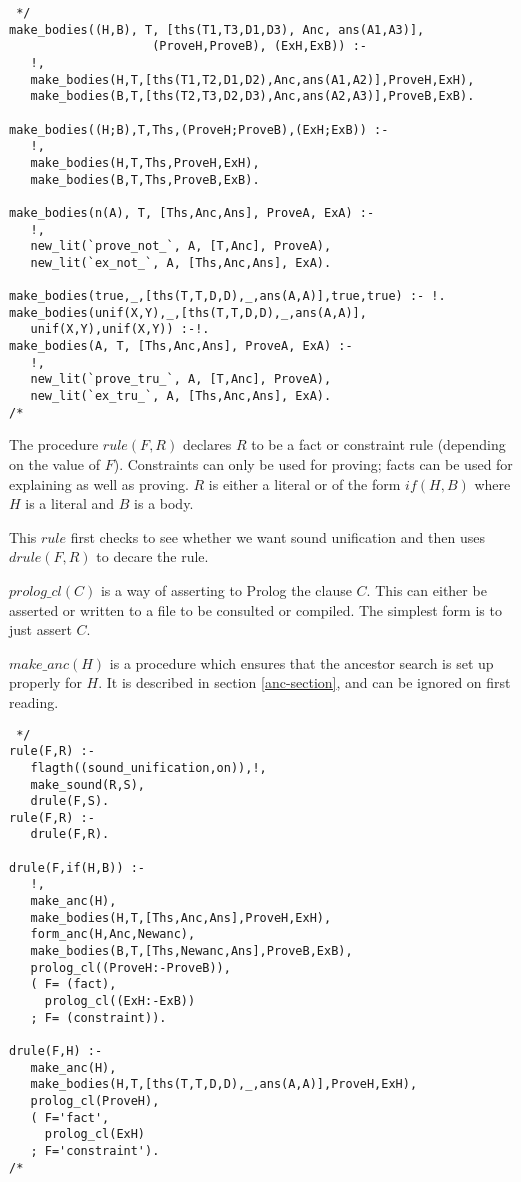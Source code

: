 \begin{verbatim} */
make_bodies((H,B), T, [ths(T1,T3,D1,D3), Anc, ans(A1,A3)],
                    (ProveH,ProveB), (ExH,ExB)) :-
   !,
   make_bodies(H,T,[ths(T1,T2,D1,D2),Anc,ans(A1,A2)],ProveH,ExH),
   make_bodies(B,T,[ths(T2,T3,D2,D3),Anc,ans(A2,A3)],ProveB,ExB).

make_bodies((H;B),T,Ths,(ProveH;ProveB),(ExH;ExB)) :-
   !,
   make_bodies(H,T,Ths,ProveH,ExH),
   make_bodies(B,T,Ths,ProveB,ExB).

make_bodies(n(A), T, [Ths,Anc,Ans], ProveA, ExA) :-
   !,
   new_lit(`prove_not_`, A, [T,Anc], ProveA),
   new_lit(`ex_not_`, A, [Ths,Anc,Ans], ExA).

make_bodies(true,_,[ths(T,T,D,D),_,ans(A,A)],true,true) :- !.
make_bodies(unif(X,Y),_,[ths(T,T,D,D),_,ans(A,A)],
   unif(X,Y),unif(X,Y)) :-!.
make_bodies(A, T, [Ths,Anc,Ans], ProveA, ExA) :-
   !,
   new_lit(`prove_tru_`, A, [T,Anc], ProveA),
   new_lit(`ex_tru_`, A, [Ths,Anc,Ans], ExA).
/* \end{verbatim}

The procedure $rule(F,R)$ declares $R$ to be a fact
or constraint rule (depending on the value of $F$).
Constraints can only be used for proving;
facts can be used for explaining as well as proving.
$R$ is either a literal or of the form $if(H,B)$ where $H$ is a literal
and $B$ is a body.

This $rule$ first checks to see whether we want sound unification and
then uses $drule(F,R)$ to decare the rule.

$prolog\_cl(C)$ is a way of asserting to Prolog the clause $C$.
This can either be asserted or written to a file to be consulted
or compiled. The simplest form is to just assert $C$.

$make\_anc(H)$ is a procedure which ensures that the ancestor search
is set up properly for $H$. It is described in section \ref{anc-section},
and can be ignored on first reading.

\begin{verbatim} */
rule(F,R) :-
   flagth((sound_unification,on)),!,
   make_sound(R,S),
   drule(F,S).
rule(F,R) :-
   drule(F,R).

drule(F,if(H,B)) :-
   !,
   make_anc(H),
   make_bodies(H,T,[Ths,Anc,Ans],ProveH,ExH),
   form_anc(H,Anc,Newanc),
   make_bodies(B,T,[Ths,Newanc,Ans],ProveB,ExB),
   prolog_cl((ProveH:-ProveB)),
   ( F= (fact),
     prolog_cl((ExH:-ExB))
   ; F= (constraint)).

drule(F,H) :-
   make_anc(H),
   make_bodies(H,T,[ths(T,T,D,D),_,ans(A,A)],ProveH,ExH),
   prolog_cl(ProveH),
   ( F='fact',
     prolog_cl(ExH)
   ; F='constraint').
/* \end{verbatim}

